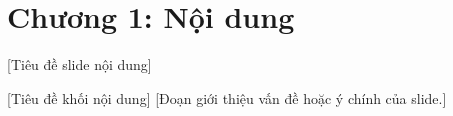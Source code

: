 \section{Chương 1: Nội dung}

\begin{frame}{[Tiêu đề slide nội dung]}
  \begin{block}{[Tiêu đề khối nội dung]}
    [Đoạn giới thiệu vấn đề hoặc ý chính của slide.]
  \end{block}
  \vspace{0.2cm}
\end{frame}
